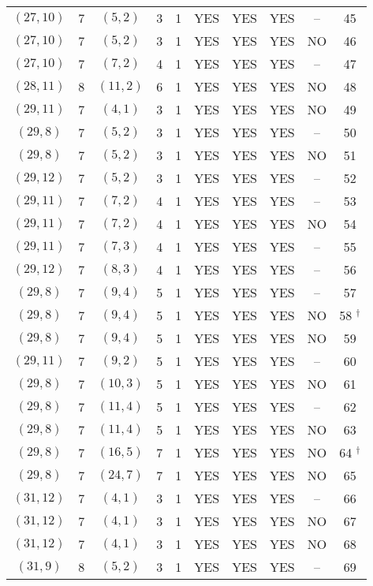 \begin{longtable}{|c|c|c|c|c|c|c|c|c|c|}
$(27, 10)$ & 7 & $(5, 2)$ & 3 & 1 & YES & YES & YES & -- & 45\\
$(27, 10)$ & 7 & $(5, 2)$ & 3 & 1 & YES & YES & YES & NO & 46\\
$(27, 10)$ & 7 & $(7, 2)$ & 4 & 1 & YES & YES & YES & -- & 47\\
$(28, 11)$ & 8 & $(11, 2)$ & 6 & 1 & YES & YES & YES & NO & 48\\
$(29, 11)$ & 7 & $(4, 1)$ & 3 & 1 & YES & YES & YES & NO & 49\\
$(29, 8)$ & 7 & $(5, 2)$ & 3 & 1 & YES & YES & YES & -- & 50\\
$(29, 8)$ & 7 & $(5, 2)$ & 3 & 1 & YES & YES & YES & NO & 51\\
$(29, 12)$ & 7 & $(5, 2)$ & 3 & 1 & YES & YES & YES & -- & 52\\
$(29, 11)$ & 7 & $(7, 2)$ & 4 & 1 & YES & YES & YES & -- & 53\\
$(29, 11)$ & 7 & $(7, 2)$ & 4 & 1 & YES & YES & YES & NO & 54\\
$(29, 11)$ & 7 & $(7, 3)$ & 4 & 1 & YES & YES & YES & -- & 55\\
$(29, 12)$ & 7 & $(8, 3)$ & 4 & 1 & YES & YES & YES & -- & 56\\
$(29, 8)$ & 7 & $(9, 4)$ & 5 & 1 & YES & YES & YES & -- & 57\\
$(29, 8)$ & 7 & $(9, 4)$ & 5 & 1 & YES & YES & YES & NO & 58 ${}^\dagger$\\
$(29, 8)$ & 7 & $(9, 4)$ & 5 & 1 & YES & YES & YES & NO & 59\\
$(29, 11)$ & 7 & $(9, 2)$ & 5 & 1 & YES & YES & YES & -- & 60\\
$(29, 8)$ & 7 & $(10, 3)$ & 5 & 1 & YES & YES & YES & NO & 61\\
$(29, 8)$ & 7 & $(11, 4)$ & 5 & 1 & YES & YES & YES & -- & 62\\
$(29, 8)$ & 7 & $(11, 4)$ & 5 & 1 & YES & YES & YES & NO & 63\\
$(29, 8)$ & 7 & $(16, 5)$ & 7 & 1 & YES & YES & YES & NO & 64 ${}^\dagger$\\
$(29, 8)$ & 7 & $(24, 7)$ & 7 & 1 & YES & YES & YES & NO & 65\\
$(31, 12)$ & 7 & $(4, 1)$ & 3 & 1 & YES & YES & YES & -- & 66\\
$(31, 12)$ & 7 & $(4, 1)$ & 3 & 1 & YES & YES & YES & NO & 67\\
$(31, 12)$ & 7 & $(4, 1)$ & 3 & 1 & YES & YES & YES & NO & 68\\
$(31, 9)$ & 8 & $(5, 2)$ & 3 & 1 & YES & YES & YES & -- & 69\\

\end{longtable}
